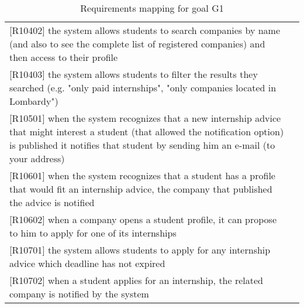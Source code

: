 \begin{table} [h!]
\begin{tabular}{ || P{5cm} P{5cm} || }
					[R10402] the system allows students to search companies by name (and also to see the complete list of registered companies) and then access to their profile & \\
					
					[R10403] the system allows students to filter the results they searched (e.g. "only paid internships", "only companies located in Lombardy") & \\
					
					[R10501] when the system recognizes that a new internship advice that might interest a student (that allowed the notification option) is published it notifies that student by sending him an e-mail (to your address) & \\
					
					[R10601] when the system recognizes that a student has a profile that would fit an internship advice, the company that published the advice is notified & \\
					
					[R10602] when a company opens a student profile, it can propose to him to apply for one of its internships & \\
					
					[R10701] the system allows students to apply for any internship advice which deadline has not expired & \\
					
					[R10702] when a student applies for an internship, the related company is notified by the system & \\ [1ex]
					\hline
				\end{tabular}
				\caption{Requirements mapping for goal G1}
				\label {table:1}
			\end{table}
